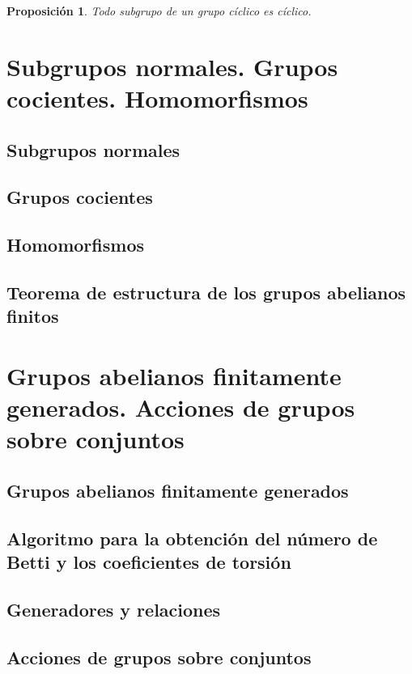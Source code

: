 \documentclass[12pt]{article}
\newtheorem{proposition}[theorem]{Proposición}
\begin{document}
\begin{proposition}Todo subgrupo de un grupo cíclico es cíclico.
\end{proposition}

\section{Subgrupos normales. Grupos cocientes. Homomorfismos}
\subsection{Subgrupos normales}
\subsection{Grupos cocientes}
\subsection{Homomorfismos}
\subsection{Teorema de estructura de los grupos abelianos finitos}
\section{Grupos abelianos finitamente generados. Acciones de grupos sobre conjuntos}
\subsection{Grupos abelianos finitamente generados}
\subsection{Algoritmo para la obtención del número de Betti y los coeficientes de torsión}
\subsection{Generadores y relaciones}
\subsection{Acciones de grupos sobre conjuntos}
\end{document}
